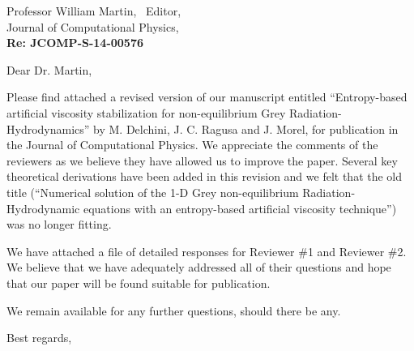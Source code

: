 \documentclass[11pt]{letter}
\begin{document}
\begin{letter}{Professor William Martin, \  Editor,\\
    Journal of Computational Physics,\\
\textbf{Re: JCOMP-S-14-00576}}


\date{\today}

\opening{Dear Dr. Martin,}
         \vspace{0.25cm}

Please find attached a revised version of our manuscript entitled
``Entropy-based artificial viscosity stabilization for non-equilibrium Grey Radiation-Hydrodynamics''
by M. Delchini, J. C. Ragusa and J. Morel, for
publication in the Journal of Computational Physics. We appreciate the comments of the reviewers as we
believe they have allowed us to improve the paper. Several key theoretical derivations 
have been added in this revision and we felt that the old title (``Numerical solution of the 1-D Grey non-equilibrium 
Radiation-Hydrodynamic equations with an entropy-based artificial viscosity technique'') was no longer 
fitting.

We have attached a file of detailed responses for Reviewer \#1 and Reviewer \#2.
We believe that we have adequately addressed all of their questions and hope that our paper will be found suitable for publication.

%
%
\bigskip

We remain available for any further questions, should there be any.
\vspace{0.25cm}



\closing{Best regards, }

\end{letter}
\end{document}
